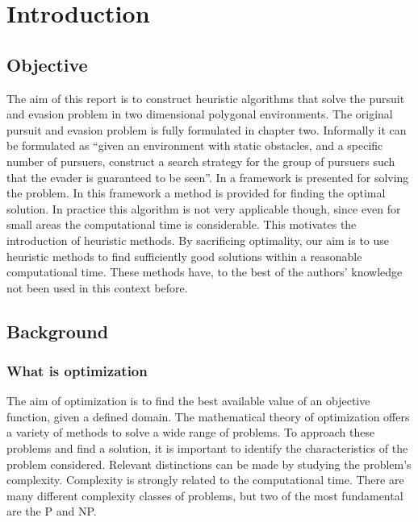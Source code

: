 \chapter{Introduction}

\section{Objective}
The aim of this report is to construct heuristic algorithms that solve the pursuit and evasion problem in two dimensional polygonal environments. The original pursuit and evasion problem is fully formulated in chapter two. Informally it can be formulated as ``given an environment with static obstacles, and a specific number of pursuers, construct a search strategy for the group of pursuers such that the evader is guaranteed to be seen''. In \cite{paper3} a framework is presented for solving the problem. In this framework a method is provided for finding the optimal solution. In practice this algorithm is not very applicable though, since even for small areas the computational time is considerable. This motivates the introduction of heuristic methods. By sacrificing optimality, our aim is to use heuristic methods to find sufficiently good solutions within a reasonable computational time. These methods have, to the best of the authors' knowledge not been used in this context before.
\section{Background}
\subsection{What is optimization}
The aim of optimization is to find the best available value of an objective function, given a defined domain. %
The mathematical theory of optimization offers a variety of methods to solve a wide range of problems. To approach these problems and find a solution, it is important to identify the characteristics of the problem considered. Relevant distinctions can be made by studying the problem's complexity. Complexity is strongly related to the computational time. There are many different complexity classes of problems, but two of the most fundamental are the P and NP.

